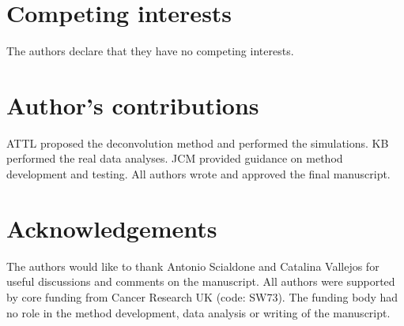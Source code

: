 \documentclass{bmcart}
\begin{document}
\begin{backmatter}

\section*{Competing interests}
The authors declare that they have no competing interests.

\section*{Author's contributions}
ATTL proposed the deconvolution method and performed the simulations.
KB performed the real data analyses.
JCM provided guidance on method development and testing.
All authors wrote and approved the final manuscript.

\section*{Acknowledgements}
The authors would like to thank Antonio Scialdone and Catalina Vallejos for useful discussions and comments on the manuscript.
All authors were supported by core funding from Cancer Research UK (code: SW73).
The funding body had no role in the method development, data analysis or writing of the manuscript.




\end{backmatter}
\end{document}
